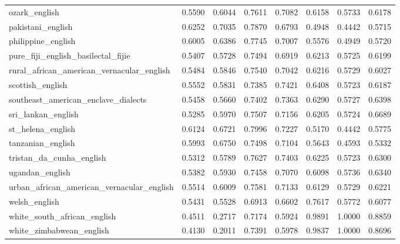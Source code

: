 \begin{landscape}
\begin{longtable}{lccccccc}
ozark\_english & 0.5590 & 0.6044 & 0.7611 & 0.7082 & 0.6158 & 0.5733 & 0.6178 \\
pakistani\_english & 0.6252 & 0.7035 & 0.7870 & 0.6793 & 0.4948 & 0.4442 & 0.5715 \\
philippine\_english & 0.6005 & 0.6386 & 0.7745 & 0.7007 & 0.5576 & 0.4949 & 0.5720 \\
pure\_fiji\_english\_basilectal\_fijie & 0.5407 & 0.5728 & 0.7494 & 0.6919 & 0.6213 & 0.5725 & 0.6199 \\
rural\_african\_american\_vernacular\_english & 0.5484 & 0.5846 & 0.7540 & 0.7042 & 0.6216 & 0.5729 & 0.6027 \\
scottish\_english & 0.5552 & 0.5831 & 0.7385 & 0.7421 & 0.6408 & 0.5723 & 0.6187 \\
southeast\_american\_enclave\_dialects & 0.5458 & 0.5660 & 0.7402 & 0.7363 & 0.6290 & 0.5727 & 0.6398 \\
sri\_lankan\_english & 0.5285 & 0.5970 & 0.7507 & 0.7156 & 0.6205 & 0.5724 & 0.6689 \\
st\_helena\_english & 0.6124 & 0.6721 & 0.7996 & 0.7227 & 0.5170 & 0.4442 & 0.5775 \\
tanzanian\_english & 0.5993 & 0.6750 & 0.7498 & 0.7104 & 0.5643 & 0.4593 & 0.5332 \\
tristan\_da\_cunha\_english & 0.5312 & 0.5789 & 0.7627 & 0.7403 & 0.6225 & 0.5723 & 0.6300 \\
ugandan\_english & 0.5382 & 0.5930 & 0.7458 & 0.7070 & 0.6098 & 0.5736 & 0.6340 \\
urban\_african\_american\_vernacular\_english & 0.5514 & 0.6009 & 0.7581 & 0.7133 & 0.6129 & 0.5729 & 0.6221 \\
welsh\_english & 0.5431 & 0.5528 & 0.6913 & 0.6602 & 0.7617 & 0.5772 & 0.6077 \\
white\_south\_african\_english & 0.4511 & 0.2717 & 0.7174 & 0.5924 & 0.9891 & 1.0000 & 0.8859 \\
white\_zimbabwean\_english & 0.4130 & 0.2011 & 0.7391 & 0.5978 & 0.9837 & 1.0000 & 0.8696 \\
\bottomrule
\end{longtable}
\end{landscape}
